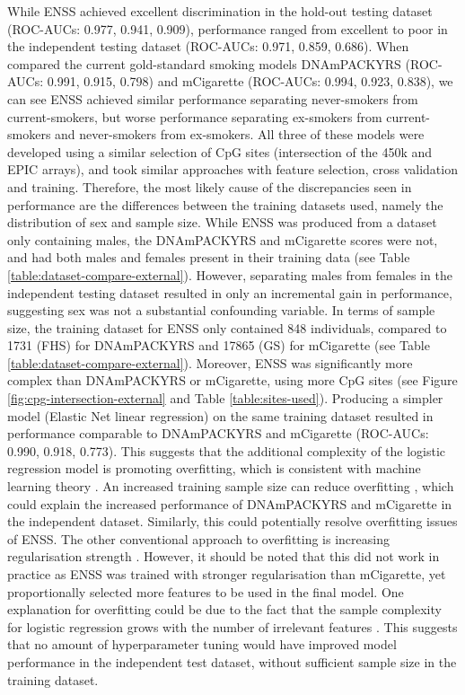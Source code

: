 \documentclass[draft]{article} %
\begin{document}
While ENSS achieved excellent discrimination in the hold-out testing dataset (ROC-AUCs: 0.977, 0.941, 0.909), performance ranged from excellent to poor in the independent testing dataset (ROC-AUCs: 0.971, 0.859, 0.686). When compared the current gold-standard smoking models DNAmPACKYRS (ROC-AUCs: 0.991, 0.915, 0.798) and mCigarette (ROC-AUCs: 0.994, 0.923, 0.838), we can see ENSS achieved similar performance separating never-smokers from current-smokers, but worse performance separating ex-smokers from current-smokers and never-smokers from ex-smokers. All three of these models were developed using a similar selection of CpG sites (intersection of the 450k and EPIC arrays), and took similar approaches with feature selection, cross validation and training. Therefore, the most likely cause of the discrepancies seen in performance are the differences between the training datasets used, namely the distribution of sex and sample size. While ENSS was produced from a dataset only containing males, the DNAmPACKYRS and mCigarette scores were not, and had both males and females present in their training data (see Table \ref{table:dataset-compare-external}). However, separating males from females in the independent testing dataset resulted in only an incremental gain in performance, suggesting sex was not a substantial confounding variable. In terms of sample size, the training dataset for ENSS only contained 848 individuals, compared to \num{1731} (FHS) for DNAmPACKYRS and \num{17865} (GS) for mCigarette (see Table \ref{table:dataset-compare-external}). Moreover, ENSS was significantly more complex than DNAmPACKYRS or mCigarette, using more CpG sites (see Figure \ref{fig:cpg-intersection-external} and Table \ref{table:sites-used}). Producing a simpler model (Elastic Net linear regression) on the same training dataset resulted in performance comparable to DNAmPACKYRS and mCigarette (ROC-AUCs: 0.990, 0.918, 0.773). This suggests that the additional complexity of the logistic regression model is promoting overfitting, which is consistent with machine learning theory \cite{bishop2006pattern}. An increased training sample size can reduce overfitting \cite{bishop2006pattern}, which could explain the increased performance of DNAmPACKYRS and mCigarette in the independent dataset. Similarly, this could potentially resolve overfitting issues of ENSS. The other conventional approach to overfitting is increasing regularisation strength \cite{buhlmann2011statistics}. However, it should be noted that this did not work in practice as ENSS was trained with stronger regularisation than mCigarette, yet proportionally selected more features to be used in the final model. One explanation for overfitting could be due to the fact that the sample complexity for logistic regression grows with the number of irrelevant features \cite{ng2004feature}. This suggests that no amount of hyperparameter tuning would have improved model performance in the independent test dataset, without sufficient sample size in the training dataset.
\end{document}
